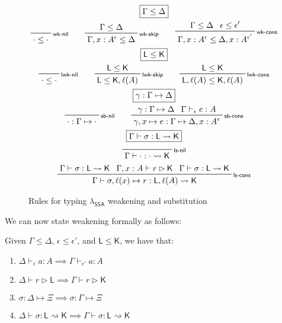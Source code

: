 \documentclass[acmsmall,screen,review]{acmart}
\newcounter{todos}
\newcommand{\todo}[1]{\stepcounter{todos} \textcolor{red}{\textbf{TODO \arabic{todos}}: #1}}
\newcommand{\ms}[1]{\ensuremath{\mathsf{#1}}}
\newcommand{\thyp}[3]{#1 : {#2}^{#3}}
\newcommand{\bhyp}[2]{#1 : #2}
\newcommand{\lhyp}[2]{#1(#2)}
\newcommand{\rle}[1]{{\scriptsize\textsf{#1}}}
\newcommand{\hasty}[4]{#1 \vdash_{#2} #3: {#4}}
\newcommand{\haslb}[3]{#1 \vdash #2 \rhd #3}
\newcommand{\issubst}[3]{#1: #2 \mapsto #3}
\newcommand{\lbsubst}[4]{#1 \vdash #2: #3 \rightsquigarrow #4}
\newcommand{\isotopessa}{\(\lambda_{\ms{SSA}}\)}
\begin{document}
\begin{figure}
  \begin{gather*}
    \boxed{\Gamma \leq \Delta} \\
    \prftree[r]{\rle{wk-nil}}{}{\cdot \leq \cdot} \qquad
    \prftree[r]{\rle{wk-skip}}{\Gamma \leq \Delta}{\Gamma, \thyp{x}{A}{\epsilon} \leq \Delta} \qquad
    \prftree[r]{\rle{wk-cons}}{\Gamma \leq \Delta}{\epsilon \leq \epsilon'}
      {\Gamma, \thyp{x}{A}{\epsilon} \leq \Delta, \thyp{x}{A}{\epsilon'}} \\
    \boxed{\ms{L} \leq \ms{K}} \\
    \prftree[r]{\rle{lwk-nil}}{}{\cdot \leq \cdot} \qquad
    \prftree[r]{\rle{lwk-skip}}{\ms{L} \leq \ms{K}}{\ms{L} \leq \ms{K}, \lhyp{\ell}{A}} \qquad
    \prftree[r]{\rle{lwk-cons}}{\ms{L} \leq \ms{K}}
      {\ms{L}, \lhyp{\ell}{A} \leq \ms{K}, \lhyp{\ell}{A}} \\
    \boxed{\issubst{\gamma}{\Gamma}{\Delta}} \\
    \prftree[r]{\rle{sb-nil}}{}{\issubst{\cdot}{\Gamma}{\cdot}} \qquad
    \prftree[r]{\rle{sb-cons}}{\issubst{\gamma}{\Gamma}{\Delta}}{\hasty{\Gamma}{\epsilon}{e}{A}}
      {\issubst{\gamma, x \mapsto e}{\Gamma}{\Delta, \thyp{x}{A}{\epsilon}}}
       \\
    \boxed{\lbsubst{\Gamma}{\sigma}{\ms{L}}{\ms{K}}} \\
    \prftree[r]{\rle{ls-nil}}{}{\lbsubst{\Gamma}{\cdot}{\cdot}{\ms{K}}}
    \\
    \prftree[r]{\rle{ls-cons}}
      {\lbsubst{\Gamma}{\sigma}{\ms{L}}{\ms{K}}}{\haslb{\Gamma, \bhyp{x}{A}}{r}{\ms{K}}}
      {\lbsubst{\Gamma}{\sigma}{\ms{L}}{\ms{K}}}
      {\lbsubst{\Gamma}{\sigma, \ell(x) \mapsto r}{\ms{L}, \lhyp{\ell}{A}}{\ms{K}}}
  \end{gather*}
  \caption{Rules for typing \isotopessa{} weakening and substitution}
  \Description{}
  \label{fig:ssa-meta-rules}
\end{figure}

We can now state weakening formally as follows:
\begin{lemma}[Weakening]
  Given $\Gamma \leq \Delta$, $\epsilon \leq \epsilon'$, and $\ms{L} \leq \ms{K}$, we have that:
  \begin{enumerate}[label=(\alph*)]
    \item $\hasty{\Delta}{\epsilon}{a}{A} \implies \hasty{\Gamma}{\epsilon'}{a}{A}$
    \item $\haslb{\Delta}{r}{\ms{L}} \implies \haslb{\Gamma}{r}{\ms{K}}$
    \item $\issubst{\sigma}{\Delta}{\Xi} \implies \issubst{\sigma}{\Gamma}{\Xi}$
    \item $\lbsubst{\Delta}{\sigma}{\ms{L}}{\ms{K}} \implies \lbsubst{\Gamma}{\sigma}{\ms{L}}{\ms{K}}$
  \end{enumerate}
\end{lemma}
\end{document}
